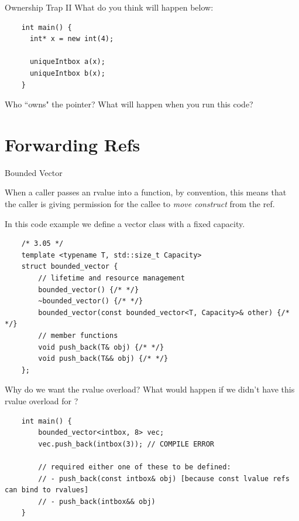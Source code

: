 \begin{frame}[fragile]{Ownership Trap II}
  What do you think will happen below:
  \begin{verbatim}
    int main() {
      int* x = new int(4);
    
      uniqueIntbox a(x);
      uniqueIntbox b(x);
    }
  \end{verbatim}

  Who ``owns" the pointer? What will happen when you run this code?
\end{frame}

\section{Forwarding Refs}

\begin{frame}[fragile]{Bounded Vector}
  \begin{sqt:result}
    When a caller passes an rvalue into a function,
    by convention, this means that the caller is giving permission 
    for the callee to \emph{move construct} from the ref.
  \end{sqt:result}
  In this code example we define a vector class with a fixed capacity.
  \begin{verbatim}
    /* 3.05 */
    template <typename T, std::size_t Capacity>
    struct bounded_vector {
        // lifetime and resource management
        bounded_vector() {/* */}
        ~bounded_vector() {/* */}
        bounded_vector(const bounded_vector<T, Capacity>& other) {/* */}
        // member functions
        void push_back(T& obj) {/* */}
        void push_back(T&& obj) {/* */}
    };
  \end{verbatim}
\end{frame}

\begin{frame}[fragile]{Why do we want the rvalue overload?}
  What would happen if we didn't have this rvalue overload for ?

  \begin{verbatim}
    int main() {
        bounded_vector<intbox, 8> vec;
        vec.push_back(intbox(3)); // COMPILE ERROR

        // required either one of these to be defined:
        // - push_back(const intbox& obj) [because const lvalue refs can bind to rvalues]
        // - push_back(intbox&& obj)
    }
  \end{verbatim}
\end{frame}

